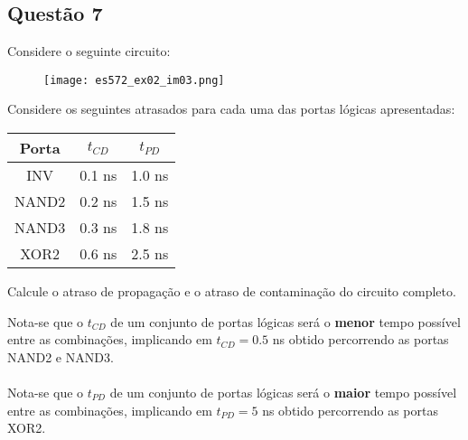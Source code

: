 \documentclass{article}
\begin{document}
        \subsection{Questão 7}
            \begin{exercise}
                Considere o seguinte circuito:
                    \begin{figure}[H]
                        \centering
                        \texttt{[image: es572\_ex02\_im03.png]}
                    \end{figure} \noindent
                Considere os seguintes atrasados para cada uma das portas lógicas apresentadas:
                    \begin{table}[H]
                        \centering  
                        \begin{tabular}[]{c|cc}\hline
                            Porta & $t_{CD}$ & $t_{PD}$\\\hline
                            INV   & 0.1 ns   & 1.0 ns\\
                            NAND2 & 0.2 ns   & 1.5 ns\\
                            NAND3 & 0.3 ns   & 1.8 ns\\
                            XOR2  & 0.6 ns   & 2.5 ns\\\hline
                        \end{tabular}
                    \end{table}
                Calcule o atraso de propagação e o atraso de contaminação do circuito completo.
            \end{exercise}
            \begin{resolution}
                Nota-se que o $t_{CD}$ de um conjunto de portas lógicas  será o \textbf{menor} tempo possível entre as combinações, implicando em $t_{CD} = 0.5$ ns obtido percorrendo as portas NAND2 e NAND3.
                \\\\
                Nota-se que o $t_{PD}$ de um conjunto de portas lógicas será o \textbf{maior} tempo possível entre as combinações, implicando em $t_{PD} = 5$ ns obtido percorrendo as portas XOR2.
            \end{resolution}
\end{document}
